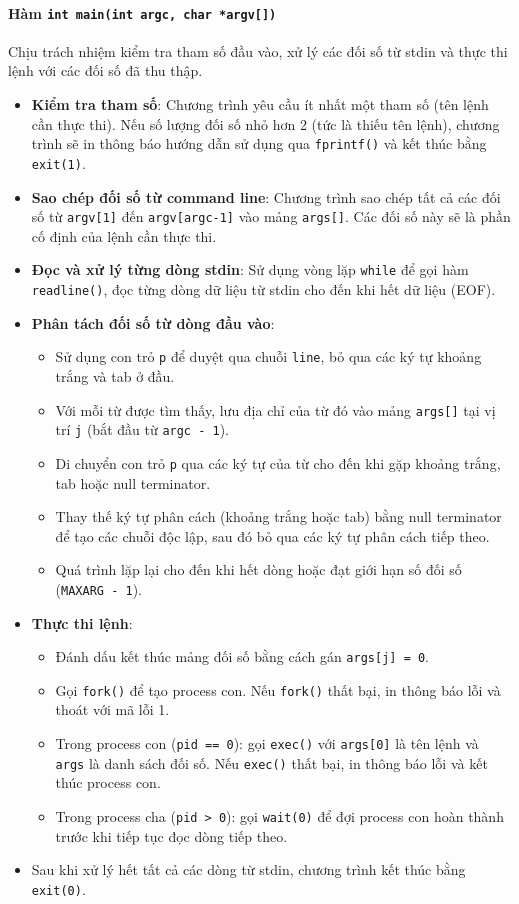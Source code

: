 \paragraph{Hàm \texttt{int main(int argc, char *argv[])}}
Chịu trách nhiệm kiểm tra tham số đầu vào, xử lý các đối số từ stdin và thực thi lệnh với các đối số đã thu thập.

\begin{itemize}
    \item \textbf{Kiểm tra tham số}: Chương trình yêu cầu ít nhất một tham số (tên lệnh cần thực thi). Nếu số lượng đối số nhỏ hơn 2 (tức là thiếu tên lệnh), chương trình sẽ in thông báo hướng dẫn sử dụng qua \texttt{fprintf()} và kết thúc bằng \texttt{exit(1)}.

    \item \textbf{Sao chép đối số từ command line}: Chương trình sao chép tất cả các đối số từ \texttt{argv[1]} đến \texttt{argv[argc-1]} vào mảng \texttt{args[]}. Các đối số này sẽ là phần cố định của lệnh cần thực thi.

    \item \textbf{Đọc và xử lý từng dòng stdin}: Sử dụng vòng lặp \texttt{while} để gọi hàm \texttt{readline()}, đọc từng dòng dữ liệu từ stdin cho đến khi hết dữ liệu (EOF).

    \item \textbf{Phân tách đối số từ dòng đầu vào}:
    \begin{itemize}
        \item Sử dụng con trỏ \texttt{p} để duyệt qua chuỗi \texttt{line}, bỏ qua các ký tự khoảng trắng và tab ở đầu.
        \item Với mỗi từ được tìm thấy, lưu địa chỉ của từ đó vào mảng \texttt{args[]} tại vị trí \texttt{j} (bắt đầu từ \texttt{argc - 1}).
        \item Di chuyển con trỏ \texttt{p} qua các ký tự của từ cho đến khi gặp khoảng trắng, tab hoặc null terminator.
        \item Thay thế ký tự phân cách (khoảng trắng hoặc tab) bằng null terminator để tạo các chuỗi độc lập, sau đó bỏ qua các ký tự phân cách tiếp theo.
        \item Quá trình lặp lại cho đến khi hết dòng hoặc đạt giới hạn số đối số (\texttt{MAXARG - 1}).
    \end{itemize}

    \item \textbf{Thực thi lệnh}:
    \begin{itemize}
        \item Đánh dấu kết thúc mảng đối số bằng cách gán \texttt{args[j] = 0}.
        \item Gọi \texttt{fork()} để tạo process con. Nếu \texttt{fork()} thất bại, in thông báo lỗi và thoát với mã lỗi 1.
        \item Trong process con (\texttt{pid == 0}): gọi \texttt{exec()} với \texttt{args[0]} là tên lệnh và \texttt{args} là danh sách đối số. Nếu \texttt{exec()} thất bại, in thông báo lỗi và kết thúc process con.
        \item Trong process cha (\texttt{pid > 0}): gọi \texttt{wait(0)} để đợi process con hoàn thành trước khi tiếp tục đọc dòng tiếp theo.
    \end{itemize}

    \item Sau khi xử lý hết tất cả các dòng từ stdin, chương trình kết thúc bằng \texttt{exit(0)}.
\end{itemize}
